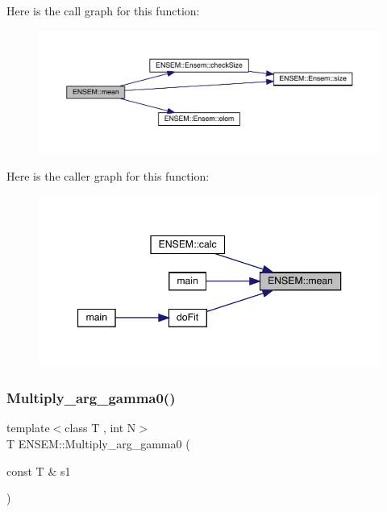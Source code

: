 Here is the call graph for this function\+:\nopagebreak
\begin{figure}[H]
\begin{center}
\leavevmode
\includegraphics[width=350pt]{d2/d94/namespaceENSEM_a57df5bdf8770d89f824a3898e08c2d81_cgraph}
\end{center}
\end{figure}
Here is the caller graph for this function\+:\nopagebreak
\begin{figure}[H]
\begin{center}
\leavevmode
\includegraphics[width=347pt]{d2/d94/namespaceENSEM_a57df5bdf8770d89f824a3898e08c2d81_icgraph}
\end{center}
\end{figure}
\mbox{\label{namespaceENSEM_ae70068bb9b31b907021cb38c9353131f}} 
\subsubsection{\texorpdfstring{Multiply\_arg\_gamma0()}{Multiply\_arg\_gamma0()}}
{\footnotesize\ttfamily template$<$class T , int N$>$ \\
T E\+N\+S\+E\+M\+::\+Multiply\+\_\+arg\+\_\+gamma0 (\begin{DoxyParamCaption}\item[{const T \&}]{s1 }\end{DoxyParamCaption})\hspace{0.3cm}{\ttfamily [inline]}}

